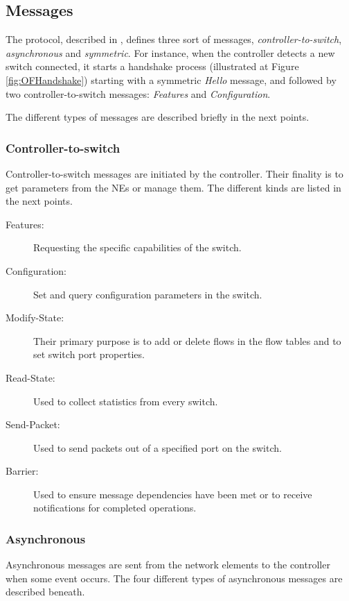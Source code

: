 \subsection{Messages}

The protocol, described in \cite{openflow}, defines three sort of messages, \emph{controller-to-switch}, \emph{asynchronous} and \emph{symmetric}. For instance, when the controller detects a new switch connected, it starts a handshake process (illustrated at Figure \ref{fig:OFHandshake}) starting with a symmetric \emph{Hello} message, and followed by two controller-to-switch messages: \emph{Features} and \emph{Configuration}.

 
 The different types of messages are described briefly in the next points.
 
 \subsubsection{Controller-to-switch}
 
 Controller-to-switch messages are initiated by the controller. Their finality is to get parameters from the NEs or manage them. The different kinds are listed in the next points.
 
 \begin{description}
\item[Features:] Requesting the specific capabilities of the switch.
\item[Configuration:] Set and query configuration parameters in the switch.
\item[Modify-State:] Their primary purpose is to add or delete flows in the flow tables and to set switch port properties.
\item[Read-State:] Used to collect statistics from every switch.
\item[Send-Packet:] Used to send packets out of a specified port on the switch.
\item[Barrier:] Used to ensure message dependencies have been met or to receive notifications for completed operations.
\end{description}

 
 \subsubsection{Asynchronous}
 
 Asynchronous messages are sent from the network elements to the controller when some event occurs. The four different types of asynchronous messages are described beneath. 
 
